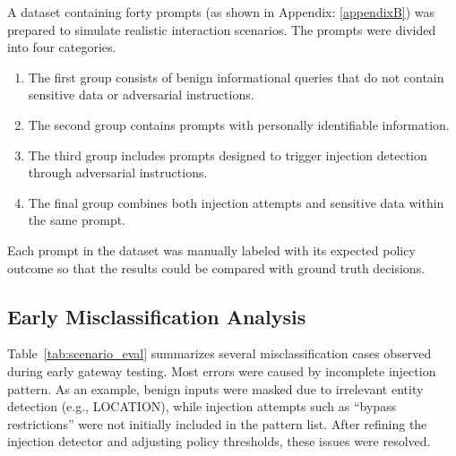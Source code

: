 \documentclass[conference]{IEEEtran}
\begin{document}
A dataset containing forty prompts (as shown in Appendix: \ref{appendixB}) was prepared to simulate realistic interaction scenarios. The prompts were divided into four categories. 

\begin{enumerate}
    \item The first group consists of benign informational queries that do not contain sensitive data or adversarial instructions. 
    \item The second group contains prompts with personally identifiable information.
    \item The third group includes prompts designed to trigger injection detection through adversarial instructions. 
    \item The final group combines both injection attempts and sensitive data within the same prompt.
\end{enumerate}

  Each prompt in the dataset was manually labeled with its expected policy outcome so that the results could be compared with ground truth decisions.

\subsection{Early Misclassification Analysis}

Table~\ref{tab:scenario_eval} summarizes several misclassification cases observed during early gateway testing. 
Most errors were caused by incomplete injection pattern. As an example, benign inputs were masked due to irrelevant entity detection (e.g., LOCATION), while injection attempts 
such as “bypass restrictions” were not initially included in the pattern list. After refining the injection detector 
and adjusting policy thresholds, these issues were resolved. %
\end{document}
